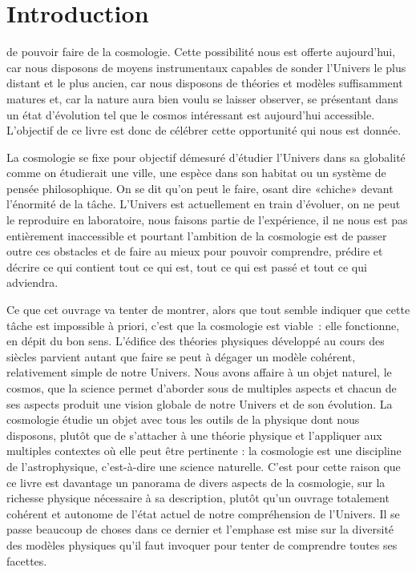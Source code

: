 \chapter*{Introduction}
 de pouvoir faire de la cosmologie. Cette possibilité nous est offerte aujourd'hui, car nous disposons de moyens instrumentaux capables de sonder l'Univers le plus distant et le plus ancien, car nous disposons de théories et modèles suffisamment matures et, car la nature aura bien voulu se laisser observer, se présentant dans un état d'évolution tel que le cosmos intéressant est aujourd'hui accessible. 
L'objectif de ce livre est donc de célébrer cette opportunité qui nous est donnée.

La cosmologie se fixe pour objectif démesuré d'étudier l'Univers dans sa globalité comme on étudierait une ville, une espèce dans son habitat ou un système de pensée philosophique. On se dit qu'on peut le faire, osant dire «chiche» devant l'énormité de la tâche. L'Univers  est actuellement en train d'évoluer, on ne peut le reproduire en laboratoire, nous faisons partie de l'expérience, il ne nous est pas entièrement inaccessible et pourtant l'ambition de la cosmologie est de passer outre ces obstacles et de faire au mieux pour pouvoir comprendre, prédire et décrire ce qui contient tout ce qui est, tout ce qui est passé et tout ce qui adviendra.

Ce que cet ouvrage va tenter de montrer, alors que tout semble indiquer que cette tâche est impossible à priori, c'est que la cosmologie est viable~: elle fonctionne, en dépit du bon sens. L'édifice des théories physiques développé au cours des siècles parvient autant que faire se peut à dégager un modèle cohérent, relativement simple de notre Univers. Nous avons affaire à un objet naturel, le cosmos, que la science permet d'aborder sous de multiples aspects et chacun de ses aspects produit une vision globale de notre Univers et de son évolution. La cosmologie étudie un objet avec tous les outils de la physique dont nous disposons, plutôt que de s'attacher à une théorie physique et l'appliquer aux multiples contextes où elle peut être pertinente : la cosmologie est une discipline de l'astrophysique, c'est-à-dire une science naturelle. C'est pour cette raison que ce livre est davantage un panorama de divers aspects de la cosmologie, sur la richesse physique nécessaire à sa description, plutôt qu'un ouvrage totalement cohérent et autonome de l'état actuel de notre compréhension de l'Univers. Il se passe beaucoup de choses dans ce dernier et l'emphase est mise sur la diversité des modèles physiques qu'il faut invoquer pour tenter de comprendre toutes ses facettes.


